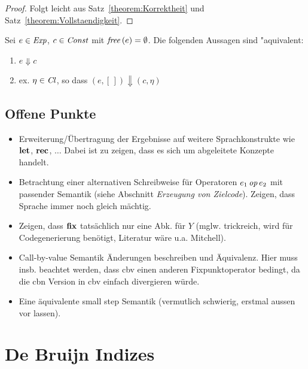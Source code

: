 \documentclass[12pt,fleqn,a4paper]{article}
\newcommand{\Cl}{\name{Cl}}
\begin{document}
\begin{proof}
  Folgt leicht aus Satz~\ref{theorem:Korrektheit} und Satz~\ref{theorem:Vollstaendigkeit}.
\end{proof}

\begin{corollary}
  Sei $e \in {\text{\it Exp\/}}$, $c \in {\text{\it Const\/}}$ mit ${\text{\it free\/}}\,(e) = \emptyset$. Die folgenden Aussagen sind "aquivalent:
  \begin{enumerate}
    \item $e \Downarrow c$
    \item ex. $\eta\in\Cl$, so dass $(e,[\,]) \Downarrow (c,\eta)$
  \end{enumerate}
\end{corollary}

\subsection*{Offene Punkte}

\begin{itemize}
\item Erweiterung/\"Ubertragung der Ergebnisse auf weitere Sprachkonstrukte wie $\mathbf{let}$, $\mathbf{rec}$, $\ldots$
  Dabei ist zu zeigen, dass es sich um abgeleitete Konzepte handelt.
\item Betrachtung einer alternativen Schreibweise f\"ur Operatoren $e_1\,{\text{\it op\/}}\,e_2$ mit passender Semantik
  (siehe Abschnitt {\em Erzeugung von Zielcode}). Zeigen, dass Sprache immer noch gleich m\"achtig.
\item Zeigen, dass $\mathbf{fix}$ tats\"achlich nur eine Abk. f\"ur $Y$ (mglw. trickreich, wird f\"ur Codegenerierung
  ben\"otigt, Literatur w\"are u.a. Mitchell).
\item Call-by-value Semantik \"Anderungen beschreiben und \"Aquivalenz. Hier muss insb. beachtet werden, dass
  cbv einen anderen Fixpunktoperator bedingt, da die cbn Version in cbv einfach divergieren w\"urde.
\item Eine \"aquivalente small step Semantik (vermutlich schwierig, erstmal aussen vor lassen).
\end{itemize}


\section{De Bruijn Indizes}
\end{document}
